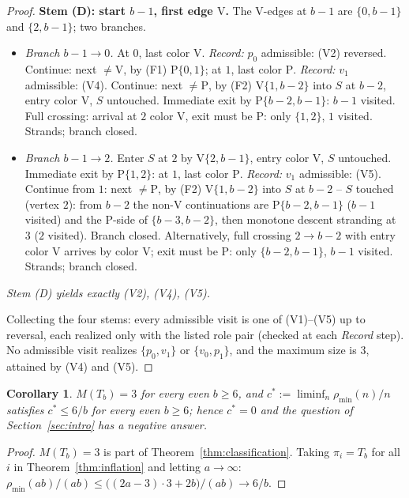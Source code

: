 \documentclass[11pt]{article}
\newtheorem{corollary}[theorem]{Corollary}
\theoremstyle{definition}
\newcommand{\pmin}{\rho_{\min}}
\begin{document}
\begin{proof}
\medskip
\noindent\textbf{Stem (D): start $b-1$, first edge $\mathrm V$.}
The V-edges at $b-1$ are $\{0, b-1\}$ and $\{2, b-1\}$; two branches.
\begin{itemize}
\item \emph{Branch $b-1 \to 0$.} At $0$, last color $\mathrm V$. \emph{Record:} $p_0$
admissible: (V2) reversed. Continue: next $\ne \mathrm V$, by (F1) $\mathrm P\{0,1\}$;
at $1$, last color $\mathrm P$. \emph{Record:} $v_1$ admissible: (V4). Continue: next
$\ne \mathrm P$, by (F2) $\mathrm V\{1,b-2\}$ into $S$ at $b-2$, entry color $\mathrm V$,
$S$ untouched. Immediate exit by $\mathrm P\{b-2,b-1\}$: $b-1$ visited. Full crossing:
arrival at $2$ color $\mathrm V$, exit must be $\mathrm P$: only $\{1,2\}$, $1$ visited.
Strands; branch closed.
\item \emph{Branch $b-1 \to 2$.} Enter $S$ at $2$ by $\mathrm V\{2,b-1\}$, entry color
$\mathrm V$, $S$ untouched. Immediate exit by $\mathrm P\{1,2\}$: at $1$, last color
$\mathrm P$. \emph{Record:} $v_1$ admissible: (V5). Continue from $1$: next
$\ne \mathrm P$, by (F2) $\mathrm V\{1,b-2\}$ into $S$ at $b-2$ -- $S$ touched (vertex
$2$): from $b-2$ the non-$\mathrm V$ continuations are $\mathrm P\{b-2,b-1\}$ ($b-1$
visited) and the P-side of $\{b-3,b-2\}$, then monotone descent stranding at $3$ ($2$
visited). Branch closed. Alternatively, full crossing $2 \to b-2$ with entry color
$\mathrm V$ arrives by color $\mathrm V$; exit must be $\mathrm P$: only $\{b-2,b-1\}$,
$b-1$ visited. Strands; branch closed.
\end{itemize}
\emph{Stem (D) yields exactly (V2), (V4), (V5).}

\medskip
Collecting the four stems: every admissible visit is one of (V1)--(V5) up to reversal,
each realized only with the listed role pair (checked at each \emph{Record} step). No
admissible visit realizes $\{p_0, v_1\}$ or $\{v_0, p_1\}$, and the maximum size is
$3$, attained by (V4) and (V5).
\end{proof}

\begin{corollary}\label{cor:M3}
$M(T_b) = 3$ for every even $b \ge 6$, and $c^* := \liminf_n \pmin(n)/n$ satisfies
$c^* \le 6/b$ for every even $b \ge 6$; hence $c^* = 0$ and the question of
Section~\ref{sec:intro} has a negative answer.
\end{corollary}

\begin{proof}
$M(T_b) = 3$ is part of Theorem~\ref{thm:classification}. Taking $\pi_i = T_b$ for all
$i$ in Theorem~\ref{thm:inflation} and letting $a \to \infty$:
$\pmin(ab)/(ab) \le \bigl((2a-3)\cdot 3 + 2b\bigr)/(ab) \to 6/b$.
\end{proof}
\end{document}
